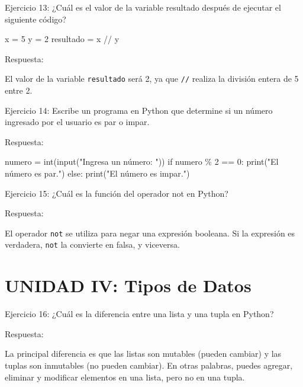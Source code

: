 \documentclass[
  a4paper,
  DIV=11,
  numbers=noendperiod,
  onepage,
  openany]{scrreprt}
\newenvironment{Shaded}{\begin{snugshade}}{\end{snugshade}}
\newcommand{\BuiltInTok}[1]{\textcolor[rgb]{0.00,0.23,0.31}{#1}}
\newcommand{\ControlFlowTok}[1]{\textcolor[rgb]{0.00,0.23,0.31}{#1}}
\newcommand{\DecValTok}[1]{\textcolor[rgb]{0.68,0.00,0.00}{#1}}
\newcommand{\NormalTok}[1]{\textcolor[rgb]{0.00,0.23,0.31}{#1}}
\newcommand{\OperatorTok}[1]{\textcolor[rgb]{0.37,0.37,0.37}{#1}}
\newcommand{\StringTok}[1]{\textcolor[rgb]{0.13,0.47,0.30}{#1}}
\begin{document}
Ejercicio 13: ¿Cuál es el valor de la variable resultado después de
ejecutar el siguiente código?

\begin{Shaded}
\begin{Highlighting}[]
\NormalTok{x }\OperatorTok{=} \DecValTok{5}
\NormalTok{y }\OperatorTok{=} \DecValTok{2}
\NormalTok{resultado }\OperatorTok{=}\NormalTok{ x }\OperatorTok{//}\NormalTok{ y}
\end{Highlighting}
\end{Shaded}

Respuesta:

El valor de la variable \texttt{resultado} será 2, ya que \texttt{//}
realiza la división entera de 5 entre 2.

Ejercicio 14: Escribe un programa en Python que determine si un número
ingresado por el usuario es par o impar.

Respuesta:

\begin{Shaded}
\begin{Highlighting}[]
\NormalTok{numero }\OperatorTok{=} \BuiltInTok{int}\NormalTok{(}\BuiltInTok{input}\NormalTok{(}\StringTok{"Ingresa un número: "}\NormalTok{))}
\ControlFlowTok{if}\NormalTok{ numero }\OperatorTok{\%} \DecValTok{2} \OperatorTok{==} \DecValTok{0}\NormalTok{:}
    \BuiltInTok{print}\NormalTok{(}\StringTok{"El número es par."}\NormalTok{)}
\ControlFlowTok{else}\NormalTok{:}
    \BuiltInTok{print}\NormalTok{(}\StringTok{"El número es impar."}\NormalTok{)}
\end{Highlighting}
\end{Shaded}

Ejercicio 15: ¿Cuál es la función del operador not en Python?

Respuesta:

El operador \texttt{not} se utiliza para negar una expresión booleana.
Si la expresión es verdadera, \texttt{not} la convierte en falsa, y
viceversa.

\section{UNIDAD IV: Tipos de Datos}\label{unidad-iv-tipos-de-datos}

Ejercicio 16: ¿Cuál es la diferencia entre una lista y una tupla en
Python?

Respuesta:

La principal diferencia es que las listas son mutables (pueden cambiar)
y las tuplas son inmutables (no pueden cambiar). En otras palabras,
puedes agregar, eliminar y modificar elementos en una lista, pero no en
una tupla.
\end{document}
